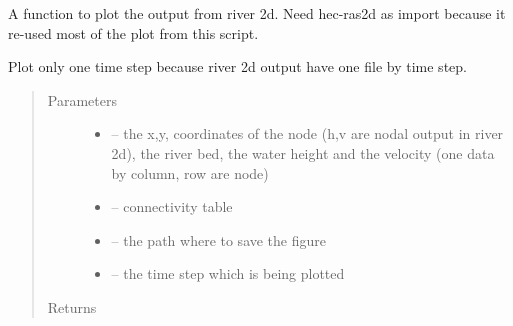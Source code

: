 \documentclass[letterpaper,10pt,english]{sphinxmanual}
\begin{document}
\begin{fulllineitems}
\label{\detokenize{index:src.river2d.figure_river2d}}
A function to plot the output from river 2d. Need hec-ras2d as import because it re-used most of the plot from this
script.

Plot only one time step because river 2d output have one file by time step.
\begin{quote}\begin{description}
\item[{Parameters}] \leavevmode\begin{itemize}
\item {} 
 -- the x,y, coordinates of the node (h,v are nodal output in river 2d), the river bed, the water height
and the velocity (one data by column, row are node)

\item {} 
 -- connectivity table

\item {} 
 -- the path where to save the figure

\item {} 
 -- the time step which is being plotted

\end{itemize}

\item[{Returns}] \leavevmode


\end{description}\end{quote}

\end{fulllineitems}

\end{document}
